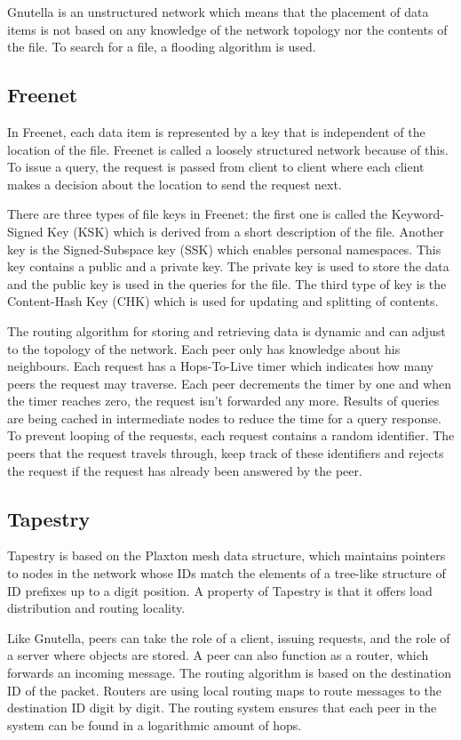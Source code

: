\documentclass[12pt,journal,compsoc]{IEEEtran}
\begin{document}
		Gnutella is an unstructured network which means that the placement of data items is not based on any knowledge of the network topology nor the contents of the file. To search for a file, a flooding algorithm is used.
	
	\subsection{Freenet} In Freenet, each data item is represented by a key that is independent of the location of the file. Freenet is called a loosely structured network because of this. To issue a query, the request is passed from client to client where each client makes a decision about the location to send the request next.
		
		There are three types of file keys in Freenet: the first one is called the Keyword-Signed Key (KSK) which is derived from a short description of the file. Another key is the Signed-Subspace key (SSK) which enables personal namespaces. This key contains a public and a private key. The private key is used to store the data and the public key is used in the queries for the file. The third type of key is the Content-Hash Key (CHK) which is used for updating and splitting of contents.
		
		The routing algorithm for storing and retrieving data is dynamic and can adjust to the topology of the network. Each peer only has knowledge about his neighbours. Each request has a Hops-To-Live timer which indicates how many peers the request may traverse. Each peer decrements the timer by one and when the timer reaches zero, the request isn't forwarded any more. Results of queries are being cached in intermediate nodes to reduce the time for a query response. To prevent looping of the requests, each request contains a random identifier. The peers that the request travels through, keep track of these identifiers and rejects the request if the request has already been answered by the peer.
		
	\subsection{Tapestry} Tapestry is based on the Plaxton mesh data structure, which maintains pointers to nodes in the network whose IDs match the elements of a tree-like structure of ID prefixes up to a digit position. A property of Tapestry is that it offers load distribution and routing locality.
		
		Like Gnutella, peers can take the role of a client, issuing requests, and the role of a server where objects are stored. A peer can also function as a router, which forwards an incoming message. The routing algorithm is based on the destination ID of the packet. Routers are using local routing maps to route messages to the destination ID digit by digit. The routing system ensures that each peer in the system can be found in a logarithmic amount of hops.
		
\end{document}
